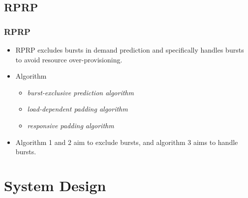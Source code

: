 \documentclass{beamer}
\begin{document}
\subsection{RPRP}
	\begin{frame}
	\frametitle{RPRP\footnotemark[1]}
		\begin{itemize}
		\item RPRP excludes bursts in demand prediction and specifically handles bursts to avoid resource over-provisioning.
		\item Algorithm
			\begin{itemize}
			\item {\it burst-exclusive prediction algorithm}
			\item {\it load-dependent padding algorithm}
			\item {\it responsive padding algorithm}
			\end{itemize}
		\item Algorithm 1 and 2 aim to exclude bursts, and algorithm 3 aims to handle bursts.
		\end{itemize}
	\end{frame}

\section{System Design}

\end{document}
